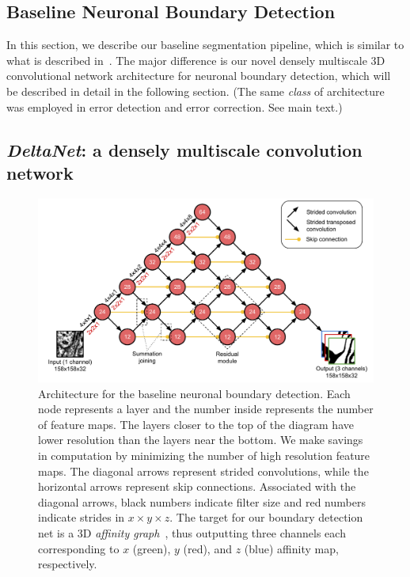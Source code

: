 \documentclass{article}
\begin{document}
\begin{appendices}

\section{Baseline Neuronal Boundary Detection}
\label{appendix:baseline}

In this section, we describe our baseline segmentation pipeline, which is
similar to what is described in~\cite{kisuk}. The major difference is our novel
densely multiscale 3D convolutional network architecture for neuronal boundary
detection, which will be described in detail in the following section. (The same
\emph{class} of architecture was employed in error detection and error
correction. See main text.)

\subsection{\textsl{DeltaNet}: a densely multiscale convolution network}
\label{sec:deltanet}

\begin{figure}[!b]
\centering
\includegraphics[width=1.0\linewidth]{baseline.pdf}

\caption{Architecture for the baseline neuronal boundary detection. Each node
represents a layer and the number inside represents the number of feature maps.
The layers closer to the top of the diagram have lower resolution than the
layers near the bottom. We make savings in computation by minimizing the number
of high resolution feature maps. The diagonal arrows represent strided
convolutions, while the horizontal arrows represent skip connections. Associated
with the diagonal arrows, black numbers indicate filter size and red numbers
indicate strides in $x\times y\times z$. The target for our boundary detection
net is a 3D \emph{affinity graph}~\cite{boundary_detection,kisuk,funke2017deep},
thus outputting three channels each corresponding to $x$ (green), $y$ (red), and
$z$ (blue) affinity map, respectively.}


\end{figure}
\end{appendices}
\end{document}
